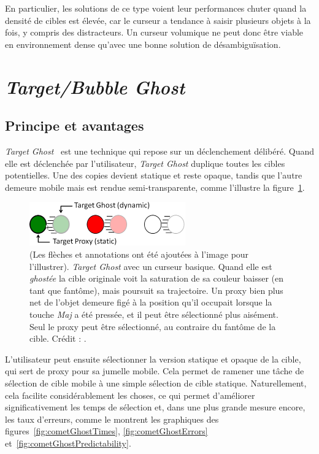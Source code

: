 	En particulier, les solutions de ce type voient leur performances chuter quand la densité de cibles est élevée, car le curseur a tendance à \og saisir \fg{} plusieurs objets à la fois, y compris des distracteurs. Un curseur volumique ne peut donc être viable en environnement dense qu'avec une bonne solution de désambiguïsation.
	
\section{\emph{Target/Bubble Ghost}}
	\subsection{Principe et avantages}
	\emph{Target Ghost}~\cite{hasan2011comet} est une technique qui repose sur un déclenchement délibéré. Quand elle est déclenchée par l'utilisateur, \emph{Target Ghost} duplique toutes les cibles potentielles. Une des copies devient statique et reste opaque, tandis que l'autre demeure mobile mais est rendue semi-transparente, comme l'illustre la figure~\ref{fig:targetGhost}.
	
	\begin{figure}[!htb]
		\centering
		\includegraphics[width=0.6\textwidth]{figures/ch2/targetGhost}
		\caption[La technique \emph{Target Ghost}]{(Les flèches et annotations ont été ajoutées à l'image pour l'illustrer). \emph{Target Ghost} avec un curseur basique. Quand elle est \og \emph{ghostée} \fg{} la cible originale voit la saturation de sa couleur baisser (en tant que fantôme), mais poursuit sa trajectoire. Un proxy bien plus net de l'objet demeure figé à la position qu'il occupait lorsque la touche \emph{Maj} a été pressée, et il peut être sélectionné plus aisément. Seul le proxy peut être sélectionné, au contraire du fantôme de la cible. Crédit : \cite{hasan2011comet}.}
		\label{fig:targetGhost}
	\end{figure}
	
	L'utilisateur peut ensuite sélectionner la version statique et opaque de la cible, qui sert de proxy pour sa jumelle mobile. Cela permet de ramener une tâche de sélection de cible mobile à une simple sélection de cible statique. Naturellement, cela facilite considérablement les choses, ce qui permet d'améliorer significativement les temps de sélection et, dans une plus grande mesure encore, les taux d'erreurs, comme le montrent les graphiques des figures~\ref{fig:cometGhostTimes}, \ref{fig:cometGhostErrors} et~\ref{fig:cometGhostPredictability}.

